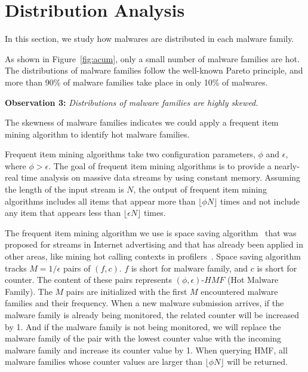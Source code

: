 \section{Distribution Analysis}
\label{sec:dist}









In this section, we study how malwares are distributed in each malware family. 

As shown in Figure~\ref{fig:acum}, only a small number of malware families are hot.
The distributions of malware families follow the well-known Pareto principle, 
and more than 90\% of malware families take place in only 10\% of malwares. 

{\bf Observation 3:} {\em Distributions of malware families are highly skewed.} 

The skewness of malware families indicates we could apply a frequent item mining algorithm to identify hot malware families. 

Frequent item mining algorithms take two configuration parameters, $\phi$ and $\epsilon$, where $\phi > \epsilon$. 
The goal of frequent item mining algorithms is to provide a nearly-real time analysis on massive data streams by using constant memory. 
Assuming the length of the input stream is $N$, the output of frequent item mining algorithms 
includes all items that appear more than $\lfloor \phi N \rfloor$ times 
and not include any item that appears less than  $\lfloor \epsilon N \rfloor$ times. 



The frequent item mining algorithm we use is space saving algorithm~\cite{space-saving} 
that was proposed for streams in Internet advertising and that has already been applied in other areas, 
like mining hot calling contexts in profilers~\cite{hot-calling-context}.
Space saving algorithm tracks $M=1/\epsilon$ pairs of $(f, c)$. 
$f$ is short for malware family, and $c$ is short for counter.  
The content of these pairs represents $(\phi, \epsilon)\mbox{-}HMF$ (Hot Malware Family). 
The $M$ pairs are initialized with the first $M$ encountered malware families and their frequency. 
When a new malware submission arrives, 
if the malware family is already being monitored, 
the related counter will be increased by 1. 
And if the malware family is not being monitored, 
we will replace the malware family of the pair with the lowest counter value with the incoming malware family
and increase its counter value by 1. 
When querying HMF, 
all malware families whose counter values are larger than $\lfloor \phi N \rfloor$ will be returned. 





